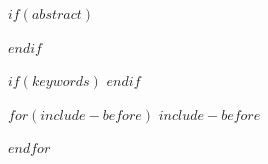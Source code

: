 $if(abstract)$
\begin{abstract}
$abstract$
\end{abstract}
$endif$

$if(keywords)$
$endif$

\maketitle


$for(include-before)$
$include-before$

$endfor$
